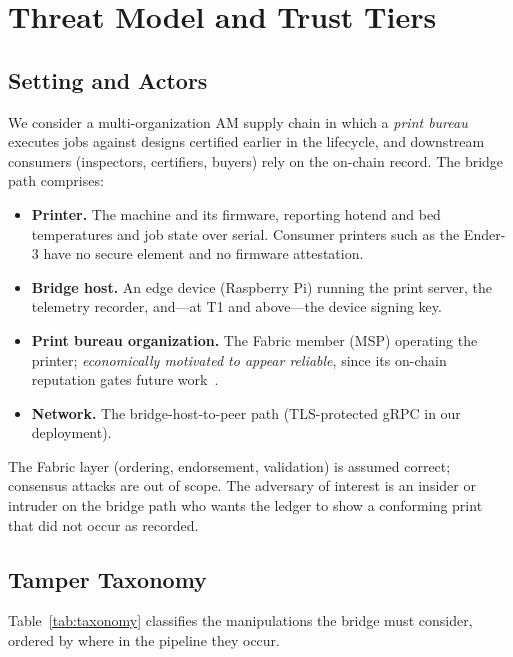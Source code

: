 \section{Threat Model and Trust Tiers}
\label{sec:threat_model}

\subsection{Setting and Actors}
\label{sec:actors}

We consider a multi-organization AM supply chain in which a \emph{print
bureau} executes jobs against designs certified earlier in the lifecycle,
and downstream consumers (inspectors, certifiers, buyers) rely on the
on-chain record.  The bridge path comprises:

\begin{itemize}
  \item \textbf{Printer.} The machine and its firmware, reporting hotend
        and bed temperatures and job state over serial.  Consumer printers
        such as the Ender-3 have no secure element and no firmware
        attestation.
  \item \textbf{Bridge host.} An edge device (Raspberry Pi) running the
        print server, the telemetry recorder, and---at T1 and above---the
        device signing key.
  \item \textbf{Print bureau organization.} The Fabric member (MSP)
        operating the printer; \emph{economically motivated to appear
        reliable}, since its on-chain reputation gates future
        work~\cite{anonymous2026unified}.
  \item \textbf{Network.} The bridge-host-to-peer path (TLS-protected
        gRPC in our deployment).
\end{itemize}

The Fabric layer (ordering, endorsement, validation) is assumed correct;
consensus attacks are out of scope.  The adversary of interest is an
insider or intruder on the bridge path who wants the ledger to show a
conforming print that did not occur as recorded.

\subsection{Tamper Taxonomy}
\label{sec:taxonomy}

Table~\ref{tab:taxonomy} classifies the manipulations the bridge must
consider, ordered by where in the pipeline they occur.

